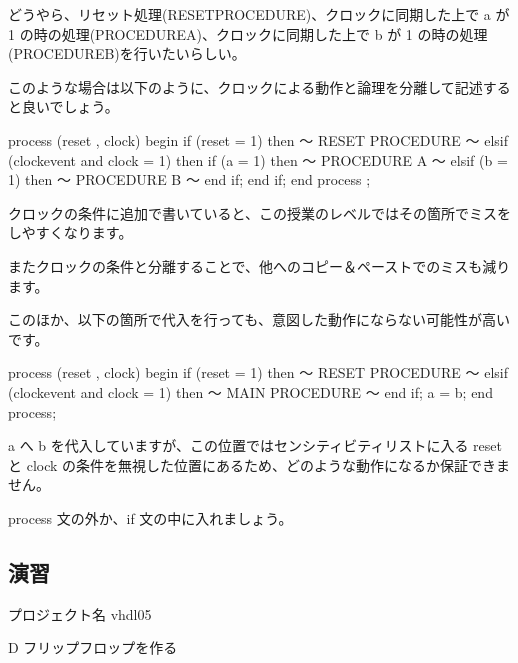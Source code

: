 \documentclass[letterpaper,10pt,dvipdfmx]{sphinxmanual}
\begin{document}
どうやら、リセット処理(RESET\sphinxhyphen{}PROCEDURE)、クロックに同期した上で a が 1 の時の処理(PROCEDURE\sphinxhyphen{}A)、クロックに同期した上で b が 1 の時の処理(PROCEDURE\sphinxhyphen{}B)を行いたいらしい。

このような場合は以下のように、クロックによる動作と論理を分離して記述すると良いでしょう。

\begin{sphinxVerbatim}[commandchars=\\\{\}]
process (reset , clock)
begin
  if (reset = \PYGZsq{}1\PYGZsq{}) then
    ～ RESET PROCEDURE ～
  elsif (clock\PYGZsq{}event and clock = \PYGZsq{}1\PYGZsq{}) then
    if (a = \PYGZsq{}1\PYGZsq{}) then
      ～ PROCEDURE A ～
    elsif (b = \PYGZsq{}1\PYGZsq{}) then
      ～ PROCEDURE B ～
    end if;
  end if;
end process ;
\end{sphinxVerbatim}

クロックの条件に追加で書いていると、この授業のレベルではその箇所でミスをしやすくなります。

またクロックの条件と分離することで、他へのコピー＆ペーストでのミスも減ります。

このほか、以下の箇所で代入を行っても、意図した動作にならない可能性が高いです。

\begin{sphinxVerbatim}[commandchars=\\\{\}]
process (reset , clock)
begin
  if (reset = \PYGZsq{}1\PYGZsq{}) then
    ～ RESET PROCEDURE ～
  elsif (clock\PYGZsq{}event and clock = \PYGZsq{}1\PYGZsq{}) then
    ～ MAIN PROCEDURE ～
  end if;
  a \PYGZlt{}= b;
end process;
\end{sphinxVerbatim}

a へ b を代入していますが、この位置ではセンシティビティリストに入る reset と clock の条件を無視した位置にあるため、どのような動作になるか保証できません。

process 文の外か、if 文の中に入れましょう。


\subsection{演習}
\label{\detokenize{05_try:id13}}
プロジェクト名 vhdl05

D フリップフロップを作る
\end{document}
